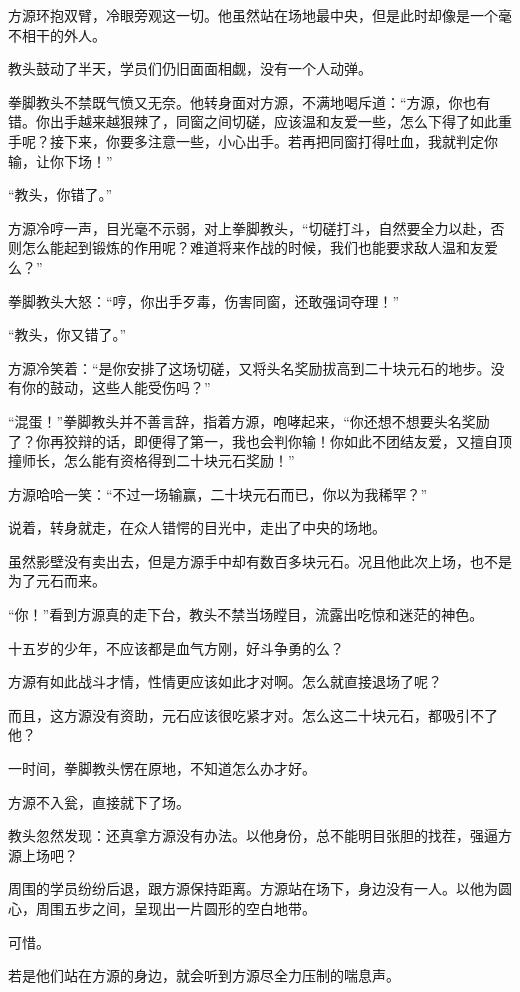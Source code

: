 \begin{this_body}
方源环抱双臂，冷眼旁观这一切。他虽然站在场地最中央，但是此时却像是一个毫不相干的外人。

教头鼓动了半天，学员们仍旧面面相觑，没有一个人动弹。

拳脚教头不禁既气愤又无奈。他转身面对方源，不满地喝斥道：“方源，你也有错。你出手越来越狠辣了，同窗之间切磋，应该温和友爱一些，怎么下得了如此重手呢？接下来，你要多注意一些，小心出手。若再把同窗打得吐血，我就判定你输，让你下场！”

“教头，你错了。”

方源冷哼一声，目光毫不示弱，对上拳脚教头，“切磋打斗，自然要全力以赴，否则怎么能起到锻炼的作用呢？难道将来作战的时候，我们也能要求敌人温和友爱么？”

拳脚教头大怒：“哼，你出手歹毒，伤害同窗，还敢强词夺理！”

“教头，你又错了。”

方源冷笑着：“是你安排了这场切磋，又将头名奖励拔高到二十块元石的地步。没有你的鼓动，这些人能受伤吗？”

“混蛋！”拳脚教头并不善言辞，指着方源，咆哮起来，“你还想不想要头名奖励了？你再狡辩的话，即便得了第一，我也会判你输！你如此不团结友爱，又擅自顶撞师长，怎么能有资格得到二十块元石奖励！”

方源哈哈一笑：“不过一场输赢，二十块元石而已，你以为我稀罕？”

说着，转身就走，在众人错愕的目光中，走出了中央的场地。

虽然影壁没有卖出去，但是方源手中却有数百多块元石。况且他此次上场，也不是为了元石而来。

“你！”看到方源真的走下台，教头不禁当场瞠目，流露出吃惊和迷茫的神色。

十五岁的少年，不应该都是血气方刚，好斗争勇的么？

方源有如此战斗才情，性情更应该如此才对啊。怎么就直接退场了呢？

而且，这方源没有资助，元石应该很吃紧才对。怎么这二十块元石，都吸引不了他？

一时间，拳脚教头愣在原地，不知道怎么办才好。

方源不入瓮，直接就下了场。

教头忽然发现：还真拿方源没有办法。以他身份，总不能明目张胆的找茬，强逼方源上场吧？

周围的学员纷纷后退，跟方源保持距离。方源站在场下，身边没有一人。以他为圆心，周围五步之间，呈现出一片圆形的空白地带。

可惜。

若是他们站在方源的身边，就会听到方源尽全力压制的喘息声。


\end{this_body}
